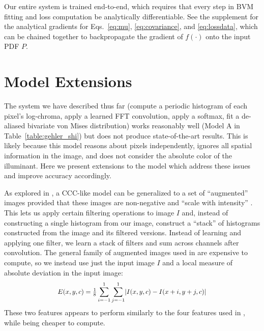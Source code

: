\documentclass[10pt,twocolumn,letterpaper]{article}
\DeclarePairedDelimiter{\abs}{\lvert}{\rvert}
\newcommand{\lossdata}[1]{f\left( #1 \right )}
\begin{document}
Our entire system is trained end-to-end, which requires
that every step in BVM fitting and loss computation be
analytically differentiable. See the supplement for the analytical gradients
for Eqs.~\ref{eq:mu}, \ref{eq:covariance}, and \ref{eq:lossdata}, which
can be chained together to backpropagate the gradient of $\lossdata{\cdot}$
onto the input PDF $P$.

\section{Model Extensions}
\label{sec:extensions}

The system we have described thus far (compute a periodic histogram of
each pixel's log-chroma, apply a learned FFT convolution, apply a softmax,
fit a de-aliased bivariate von Mises distribution) works reasonably well
(Model A in Table~\ref{table:gehler_shi})
but does not produce state-of-the-art results.
This is likely because this model reasons about pixels independently,
ignores all spatial information in the image,
and does not consider the absolute color of the illuminant.
Here we present extensions to the model which address these issues
and improve accuracy accordingly.

As explored in \cite{BarronICCV2015}, a CCC-like model
can be generalized to a set of ``augmented'' images provided that these images
are non-negative and ``scale with intensity'' \cite{Finlayson2013}.
This lets us apply certain filtering operations to image $I$ and, instead of
constructing a single histogram from our image,
construct a ``stack'' of histograms constructed from the image and its
filtered versions. Instead of learning
and applying one filter, we learn a stack of filters and sum across
channels after convolution.
The general family of augmented images used in \cite{BarronICCV2015}
are expensive to compute, so we instead use just
the input image $I$ and a local measure of absolute deviation in the input image:
\begin{equation}
\resizebox{2.9in}{!}{$
E(x,y,c) = {1 \over 8} \displaystyle \sum_{i = -1}^1 \sum_{j = -1}^1 \abs{I(x,y,c) - I(x+i,y+j,c)}
$}
\end{equation}
These two features appears to perform similarly to the four features used in
\cite{BarronICCV2015}, while being cheaper to compute.
\end{document}
